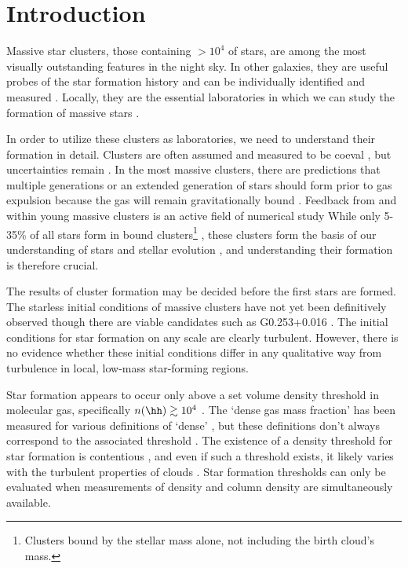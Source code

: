 \section{Introduction}

Massive star clusters, those containing $>10^4$ \msun of stars, are among the
most visually outstanding features in the night sky.  In other galaxies, they
are useful probes of the star formation history and can be individually
identified and measured \citep{Bastian2008a}.  Locally, they are the essential
laboratories in which we can study the formation of massive stars
\citep{Davies2012a}.

In order to utilize these clusters as laboratories, we need to understand their
formation in detail.  Clusters are often assumed and measured to be coeval
\citep[e.g.][]{Kudryavtseva2012a}, but uncertainties remain \citep{Beccari2010a}.
In the most massive clusters, there are predictions that multiple generations
or an extended generation of stars should form prior to gas expulsion because
the gas will remain gravitationally bound \citep{Bressert2012a}.   Feedback from
and within young massive clusters is an active field of numerical study
\citep{Rogers2013a,Dale2013a,Dale2012a,Dale2008a,Dale2005a,Parker2013a,Myers2014a,Krumholz2014a}
While
only 5-35\% of all stars form in bound clusters\footnote{Clusters bound by the
stellar mass alone, not including the birth cloud's mass.}
\citep{Kruijssen2012a}, these clusters form the basis of our understanding of
stars and stellar evolution
\citep{Kalirai2010a}, and understanding their formation is therefore crucial.

The results of cluster formation may be decided before the first stars are
formed.  The starless initial conditions of massive clusters have not yet been
definitively observed \citep{Ginsburg2012a} though there are viable candidates
such as G0.253+0.016 \citep{Longmore2012b}.  The initial conditions for star
formation on any scale are clearly turbulent.  However, there is no evidence
whether these initial conditions differ in any qualitative way from turbulence
in local, low-mass star-forming regions.

Star formation appears to occur only above a set volume density threshold in
molecular gas, specifically $n(\hh)\gtrsim10^4$ \percc \citep[][who advocate a
column density threshold corresponding to this density]{Lada2010a}.  The `dense
gas mass fraction' has been measured for various definitions of `dense'
\citep{Battisti2014a,Wu2005a}, but these definitions don't always correspond to
the associated threshold
\citep{Kauffmann2010a,Parmentier2011a,Parmentier2011b}.  The existence of a
density threshold for star formation is contentious
\citep{Burkert2012a,Clark2013b}, and even if such a threshold exists, it likely
varies with the turbulent properties of clouds \citep{Longmore2013b}.  Star
formation thresholds can only be evaluated when measurements of density and
column density are simultaneously available.  

